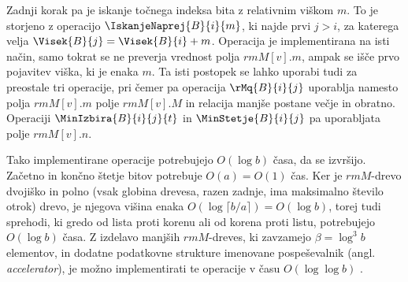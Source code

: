 Zadnji korak pa je iskanje točnega indeksa bita z relativnim viškom $m$. To je storjeno z operacijo $\IskanjeNaprej{B}{i}{m}$, ki najde prvi $j> i$, za katerega velja $\Visek{B}{j}=\Visek{B}{i}+m$. Operacija je implementirana na isti način, samo tokrat se ne preverja vrednost polja $rmM[v].m$, ampak se išče prvo pojavitev viška, ki je enaka $m$. Ta isti postopek se lahko uporabi tudi za preostale tri operacije, pri čemer pa operacija $\rMq{B}{i}{j}$ uporablja namesto polja $rmM[v].m$ polje $rmM[v].M$ in relacija manjše postane večje in obratno. Operaciji $\MinIzbira{B}{i}{j}{t}$ in $\MinStetje{B}{i}{j}$ pa uporabljata polje $rmM[v].n$\cite{Navarro2016}.

Tako implementirane operacije potrebujejo $O(\log{b})$ časa, da se izvršijo. Začetno in končno štetje bitov potrebuje $O(a)=O(1)$ čas. Ker je $rmM$-drevo dvojiško in polno (vsak globina drevesa, razen zadnje, ima maksimalno število otrok) drevo, je njegova višina enaka $O(\log{\lceil b/a\rceil})=O(\log{b})$, torej tudi sprehodi, ki gredo od lista proti korenu ali od korena proti listu, potrebujejo $O(\log{b})$ časa. Z izdelavo manjših $rmM$-dreves, ki zavzamejo $\beta=\log^3{b}$ elementov, in dodatne podatkovne strukture imenovane pospeševalnik (angl. \textit{accelerator}), je možno implementirati te operacije v času $O(\log\log{b})$ \cite{Navarro2016}.